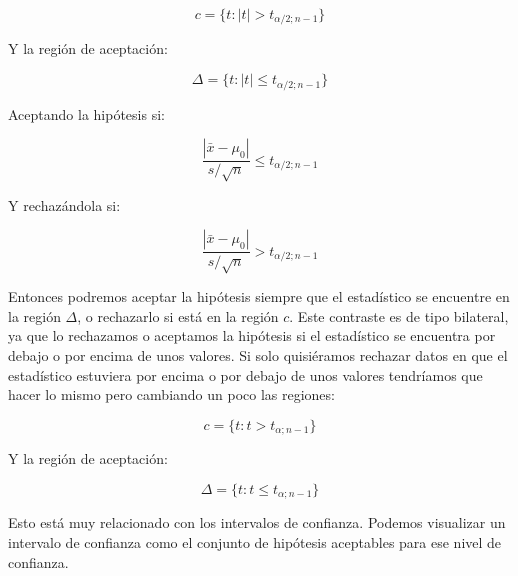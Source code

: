 \documentclass[12pt,a4paper]{book}
\begin{document}
\begin{equation}
c = \{ t: |t| > t_{\alpha/2; n-1} \}
\end{equation}

Y la región de aceptación:

\begin{equation}
\Delta = \{ t: |t| \leq t_{\alpha/2; n-1} \}
\end{equation}

Aceptando la hipótesis si:

\begin{equation}
 \dfrac{|\bar{x}-\mu_0|}{s/\sqrt{n}} \leq t_{\alpha/2; n-1}
\end{equation}

Y rechazándola si:

\begin{equation}
 \dfrac{|\bar{x}-\mu_0|}{s/\sqrt{n}} > t_{\alpha/2; n-1}
\end{equation}

Entonces podremos aceptar la hipótesis siempre que el estadístico se encuentre en la región $\Delta$, o rechazarlo si está en la región $c$. Este contraste es de tipo bilateral, ya que lo rechazamos o aceptamos la hipótesis si el estadístico se encuentra por debajo o por encima de unos valores. Si solo quisiéramos rechazar datos en que el estadístico estuviera por encima o por debajo de unos valores tendríamos que hacer lo mismo pero cambiando un poco las regiones:

\begin{equation}
c = \{ t: t > t_{\alpha; n-1} \}
\end{equation}

Y la región de aceptación:

\begin{equation}
\Delta = \{ t: t \leq t_{\alpha; n-1} \}
\end{equation}

Esto está muy relacionado con los intervalos de confianza. Podemos visualizar un intervalo de confianza como el conjunto de hipótesis aceptables para ese nivel de confianza. 
\end{document}
